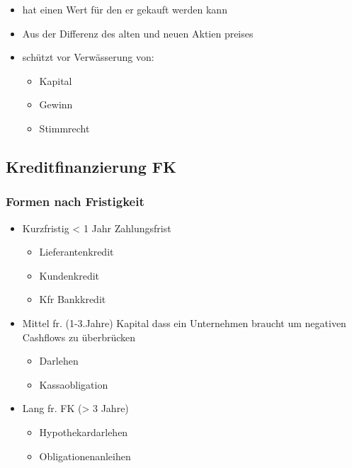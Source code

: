 \begin{itemize}
    \item hat einen Wert für den er gekauft werden kann
    \item Aus der Differenz des alten und neuen Aktien preises
    \item schützt vor Verwässerung von:
    \begin{itemize}
        \item Kapital
        \item Gewinn
        \item Stimmrecht
    \end{itemize}
\end{itemize}
\subsection{Kreditfinanzierung FK}

\subsubsection{Formen nach Fristigkeit}

\begin{itemize}
    \item Kurzfristig < 1 Jahr Zahlungsfrist
    \begin{itemize}
        \item Lieferantenkredit
        \item Kundenkredit
        \item Kfr Bankkredit
    \end{itemize}
    \item Mittel fr. (1-3.Jahre) Kapital dass ein Unternehmen braucht um negativen Cashflows zu überbrücken
    \begin{itemize}
        \item Darlehen
        \item Kassaobligation
    \end{itemize}
    \item Lang fr. FK (> 3 Jahre)
    \begin{itemize}
        \item Hypothekardarlehen
        \item Obligationenanleihen
    \end{itemize}
\end{itemize}

